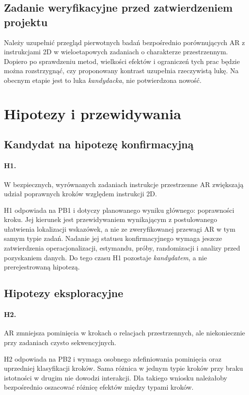 \documentclass[11pt,a4paper]{article}
\begin{document}
\subsection{Zadanie weryfikacyjne przed zatwierdzeniem projektu}
Należy uzupełnić przegląd pierwotnych badań bezpośrednio porównujących AR z instrukcjami 2D w wieloetapowych zadaniach o charakterze przestrzennym. Dopiero po sprawdzeniu metod, wielkości efektów i ograniczeń tych prac będzie można rozstrzygnąć, czy proponowany kontrast uzupełnia rzeczywistą lukę. Na obecnym etapie jest to luka \emph{kandydacka}, nie potwierdzona nowość.

\section{Hipotezy i przewidywania}
\subsection{Kandydat na hipotezę konfirmacyjną}
\paragraph{H1.} W bezpiecznych, wyrównanych zadaniach instrukcje przestrzenne AR zwiększają udział poprawnych kroków względem instrukcji 2D.

H1 odpowiada na PB1 i dotyczy planowanego wyniku głównego: poprawności kroku. Jej kierunek jest przewidywaniem wynikającym z postulowanego ułatwienia lokalizacji wskazówek, a nie ze zweryfikowanej przewagi AR w tym samym typie zadań. Nadanie jej statusu konfirmacyjnego wymaga jeszcze zatwierdzenia operacjonalizacji, estymandu, próby, randomizacji i analizy przed pozyskaniem danych. Do tego czasu H1 pozostaje \emph{kandydatem}, a nie prerejestrowaną hipotezą.

\subsection{Hipotezy eksploracyjne}
\paragraph{H2.} AR zmniejsza pominięcia w krokach o relacjach przestrzennych, ale niekoniecznie przy zadaniach czysto sekwencyjnych.

H2 odpowiada na PB2 i wymaga osobnego zdefiniowania pominięcia oraz uprzedniej klasyfikacji kroków. Sama różnica w jednym typie kroków przy braku istotności w drugim nie dowodzi interakcji. Dla takiego wniosku należałoby bezpośrednio oszacować różnicę efektów między typami kroków.
\end{document}
